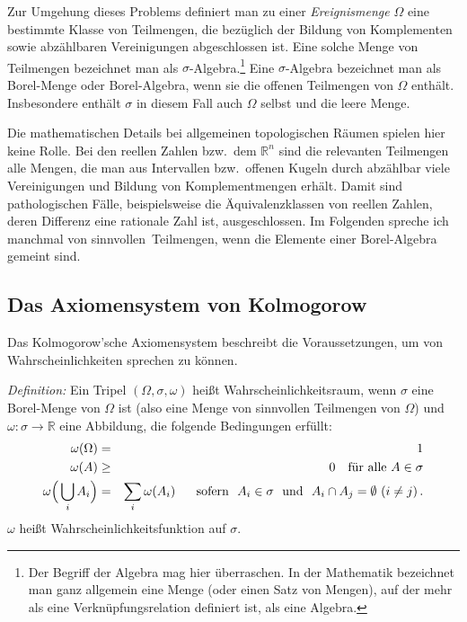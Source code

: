 Zur Umgehung dieses Problems definiert man
zu einer {\em Ereignismenge} $\Omega$ eine bestimmte 
Klasse von Teilmengen, die bez\"uglich der Bildung
von Komplementen sowie abz\"ahlbaren 
Vereinigungen abgeschlossen ist. Eine solche 
Menge von Teilmengen bezeichnet man als
$\sigma$-Algebra.\footnote{Der Begriff der Algebra mag
hier \"uberraschen. In der Mathematik bezeichnet man
ganz allgemein eine Menge (oder einen Satz von Mengen),
auf der mehr als eine Verkn\"upfungsrelation definiert ist,
als eine Algebra.} Eine $\sigma$-Algebra bezeichnet
man als Borel-Menge oder Borel-Algebra, wenn sie die 
offenen Teilmengen von $\Omega$ enth\"alt. Insbesondere
enth\"alt $\sigma$ in diesem Fall auch $\Omega$ selbst
und die leere Menge. 

Die mathematischen Details bei allgemeinen
topologischen R\"aumen spielen hier keine
Rolle. Bei den reellen Zahlen bzw.\ dem
$\mathbb{R}^n$ sind die relevanten Teilmengen
alle Mengen, die man aus Intervallen bzw.\
offenen Kugeln durch abz\"ahlbar viele
Vereinigungen und Bildung von Komplementmengen
erh\"alt. Damit sind pathologischen F\"alle, beispielsweise
die \"Aquivalenzklassen von reellen Zahlen, deren Differenz eine
rationale Zahl ist, ausgeschlossen. Im Folgenden spreche ich
manchmal von \glqq sinnvollen\grqq\ Teilmengen,
wenn die Elemente einer Borel-Algebra gemeint sind.

\subsection{Das Axiomensystem von Kolmogorow}

Das Kolmogorow'sche Axiomensystem beschreibt
die Voraussetzungen, um von Wahrscheinlichkeiten
sprechen zu k\"onnen.
\vspace{0.2cm}

\noindent
{\em Definition:} Ein Tripel $(\Omega, \sigma, \omega)$
hei\ss t Wahrscheinlichkeitsraum, wenn $\sigma$
eine Borel-Menge von $\Omega$ ist (also eine
Menge von sinnvollen Teilmengen von $\Omega$)
und $\omega: \sigma \longrightarrow \mathbb{R}$ eine
Abbildung, die folgende Bedingungen erf\"ullt:
\begin{eqnarray*}
     \omega(\Omega) &=&  1 \\
     \omega(A) & \geq & 0 ~~~ \mbox{f\"ur alle } A \in \sigma \\
     \omega \Big( \bigcup_i A_i \Big) &=& \sum_i \omega(A_i) ~~~~~  
     {\rm sofern} ~~ A_i \in \sigma ~~{\rm und} ~~ 
     A_i \cap A_j = \emptyset ~(i \neq j)  \, .
\end{eqnarray*}
$\omega$ hei\ss t Wahrscheinlichkeitsfunktion auf $\sigma$.

